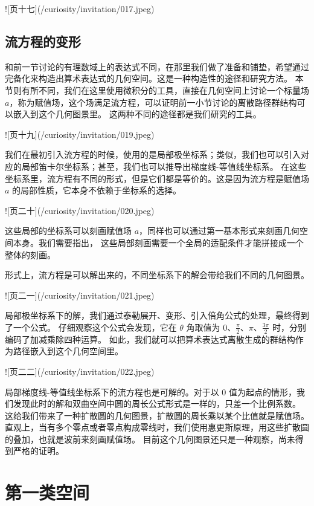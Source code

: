 \documentclass[a4paper,12pt]{book}
\numberwithin{problem}{section}
\numberwithin{definition}{section}
\numberwithin{lemma}{section}
\numberwithin{proposition}{section}
\numberwithin{theorem}{section}
\numberwithin{grammar}{section}
\numberwithin{program}{section}
\numberwithin{convention}{section}
\numberwithin{corollary}{section}
\begin{document}
![页十七](/curiosity/invitation/017.jpeg)

\section{流方程的变形}

和前一节讨论的有理数域上的表达式不同，在那里我们做了准备和铺垫，希望通过完备化来构造出算术表达式的几何空间。这是一种构造性的途径和研究方法。
本节则有所不同，我们在这里使用微积分的工具，直接在几何空间上讨论一个标量场$a$，称为赋值场，这个场满足流方程，可以证明前一小节讨论的离散路径群结构可以嵌入到这个几何图景里。
这两种不同的途径都是我们研究的工具。

![页十九](/curiosity/invitation/019.jpeg)

我们在最初引入流方程的时候，使用的是局部极坐标系；类似，我们也可以引入对应的局部笛卡尔坐标系；甚至，我们也可以推导出梯度线-等值线坐标系。
在这些坐标系里，流方程有不同的形式，但是它们都是等价的。这是因为流方程是赋值场 $a$ 的局部性质，它本身不依赖于坐标系的选择。

![页二十](/curiosity/invitation/020.jpeg)

这些局部的坐标系可以刻画赋值场 $a$，同样也可以通过第一基本形式来刻画几何空间本身。我们需要指出，
这些局部刻画需要一个全局的适配条件才能拼接成一个整体的刻画。

形式上，流方程是可以解出来的，不同坐标系下的解会带给我们不同的几何图景。

![页二一](/curiosity/invitation/021.jpeg)

局部极坐标系下的解，我们通过泰勒展开、变形、引入倍角公式的处理，最终得到了一个公式。
仔细观察这个公式会发现，它在 $\theta$ 角取值为 $0$、$\frac{\pi}{2}$、$\pi$、$\frac{3\pi}{2}$ 时，分别编码了加减乘除四种运算。
如此，我们就可以把算术表达式离散生成的群结构作为路径嵌入到这个几何空间里。

![页二二](/curiosity/invitation/022.jpeg)

局部梯度线-等值线坐标系下的流方程也是可解的。对于以 $0$ 值为起点的情形，我们发现此时的解和双曲空间中圆的周长公式形式是一样的，只差一个比例系数。
这给我们带来了一种扩散圆的几何图景，扩散圆的周长乘以某个比值就是赋值场。
直观上，当有多个零点或者零点构成零线时，我们使用惠更斯原理，用这些扩散圆的叠加，也就是波前来刻画赋值场。
目前这个几何图景还只是一种观察，尚未得到严格的证明。

\newpage

\chapter{第一类空间}
\end{document}
